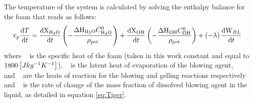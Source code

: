 The temperature of the system is calculated by solving the enthalpy balance for the foam that reads as follows:
\begin{equation}
    \mathrm{c}_p \frac{\mathrm{d}T}{\mathrm{d}t} = 
    \frac{\mathrm{d}\mathrm{X}_{\mathrm{H}_2\mathrm{O}}}{\mathrm{d}t}
    \left(
        - \frac{ \Delta \mathrm{H}_{\mathrm{H}_2\mathrm{O}} C^0_{\mathrm{H}_2\mathrm{O}} }{ \rho_{\mathrm{pet}} }
    \right) +     \frac{\mathrm{d}\mathrm{X}_{\mathrm{O}\mathrm{H}}}{\mathrm{d}t} 
    \left(
        - \frac{ \Delta \mathrm{H}_{\mathrm{O}\mathrm{H}} C^0_{\mathrm{O}\mathrm{H}} }{ \rho_{\mathrm{pet}} }
    \right) +
    \left( -\lambda \right)
    \frac{\mathrm{d} \mathrm{W}_{BL}}{\mathrm{d}t}
\end{equation}
where {~\SpecificHeatCapacity} is the specific heat of the foam (taken in this work constant and equal to $1800 \left[ J kg^{-1} K^{-1} \right]$), {~\HeatOfVaporisation} is the latent heat of evaporation of the blowing agent, {~\HeatOfReaction{\Water}} and {~\HeatOfReaction{\Hydroxyl}} are the heats of reaction for the blowing and gelling reactions respectively and {~\TimeDerivativeMassFractionLiquidBlowingAgent} is the rate of change of the mass fraction of dissolved blowing agent in the liquid, as detailed in equation \ref{eq:Tiger}. 

